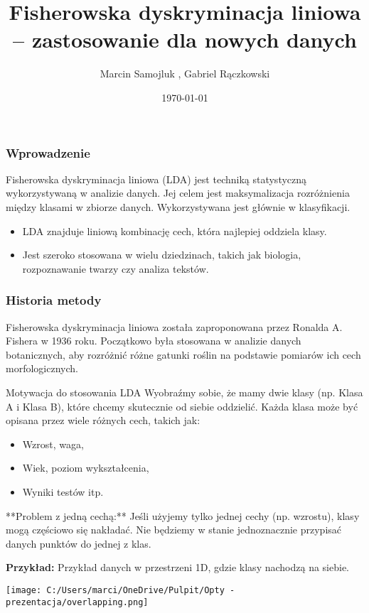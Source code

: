 \documentclass{beamer}
\title{Fisherowska dyskryminacja liniowa – zastosowanie dla nowych danych}
\author{Marcin Samojluk , Gabriel Rączkowski}
\date{\today}
\begin{document}
\begin{frame}
    \titlepage
\end{frame}

\begin{frame}
    \frametitle{Wprowadzenie}
    Fisherowska dyskryminacja liniowa (LDA) jest techniką statystyczną wykorzystywaną w analizie danych. Jej celem jest maksymalizacja rozróżnienia między klasami w zbiorze danych. Wykorzystywana jest głównie w klasyfikacji.
    \begin{itemize}
        \item LDA znajduje liniową kombinację cech, która najlepiej oddziela klasy.
        \item Jest szeroko stosowana w wielu dziedzinach, takich jak biologia, rozpoznawanie twarzy czy analiza tekstów.
    \end{itemize}
\end{frame}

\begin{frame}
    \frametitle{Historia metody}
    Fisherowska dyskryminacja liniowa została zaproponowana przez Ronalda A. Fishera w 1936 roku. Początkowo była stosowana w analizie danych botanicznych, aby rozróżnić różne gatunki roślin na podstawie pomiarów ich cech morfologicznych.
\end{frame}





\begin{frame}{Motywacja do stosowania LDA}
    Wyobraźmy sobie, że mamy dwie klasy (np. Klasa A i Klasa B), które chcemy skutecznie od siebie oddzielić. Każda klasa może być opisana przez wiele różnych cech, takich jak:
    \begin{itemize}
        \item Wzrost, waga,
        \item Wiek, poziom wykształcenia,
        \item Wyniki testów itp.
    \end{itemize}
    
    \bigskip
    **Problem z jedną cechą:** Jeśli użyjemy tylko jednej cechy (np. wzrostu), klasy mogą częściowo się nakładać. Nie będziemy w stanie jednoznacznie przypisać danych punktów do jednej z klas.

    \bigskip
    \textbf{Przykład:} Przykład danych w przestrzeni 1D, gdzie klasy nachodzą na siebie.
    
    \bigskip
    \texttt{[image: C:/Users/marci/OneDrive/Pulpit/Opty - prezentacja/overlapping.png]} 
\end{frame}
\end{document}
